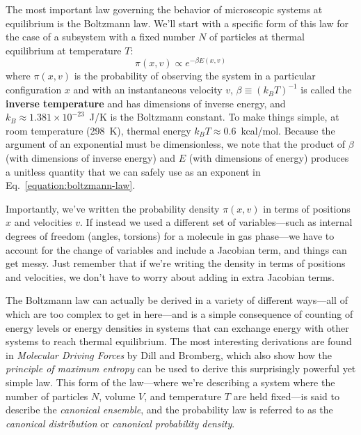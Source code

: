 \documentclass[english,course]{lecture}
\begin{document}
The most important law governing the behavior of microscopic systems at equilibrium is the Boltzmann law.
We'll start with a specific form of this law for the case of a subsystem with a fixed number $N$ of particles at thermal equilibrium at temperature $T$:
\begin{equation}
\pi(x,v) \propto e^{-\beta E(x,v)} \label{equation:boltzmann-law}
\end{equation}
where $\pi(x,v)$ is the probability of observing the system in a particular configuration $x$ and with an instantaneous velocity $v$, $\beta \equiv (k_B T)^{-1}$ is called the {\bf inverse temperature} and has dimensions of inverse energy, and $k_B \approx 1.381 \times 10^{-23}$~J/K is the Boltzmann constant.
To make things simple, at room temperature (298~K), thermal energy $k_B T \approx 0.6$~kcal/mol.
Because the argument of an exponential must be dimensionless, we note that the product of $\beta$ (with dimensions of inverse energy) and $E$ (with dimensions of energy) produces a unitless quantity that we can safely use as an exponent in Eq.~\ref{equation:boltzmann-law}.

Importantly, we've written the probability density $\pi(x,v)$ in terms of positions $x$ and velocities $v$.
If instead we used a different set of variables---such as internal degrees of freedom (angles, torsions) for a molecule in gas phase---we have to account for the change of variables and include a Jacobian term, and things can get messy.
Just remember that if we're writing the density in terms of positions and velocities, we don't have to worry about adding in extra Jacobian terms.

The Boltzmann law can actually be derived in a variety of different ways---all of which are too complex to get in here---and is a simple consequence of counting of energy levels or energy densities in systems that can exchange energy with other systems to reach thermal equilibrium.
The most interesting derivations are found in \emph{Molecular Driving Forces} by Dill and Bromberg, which also show how the \emph{principle of maximum entropy} can be used to derive this surprisingly powerful yet simple law.
This form of the law---where we're describing a system where the number of particles $N$, volume $V$, and temperature $T$ are held fixed---is said to describe the \emph{canonical ensemble}, and the probability law is referred to as the \emph{canonical distribution} or \emph{canonical probability density}.
\end{document}

